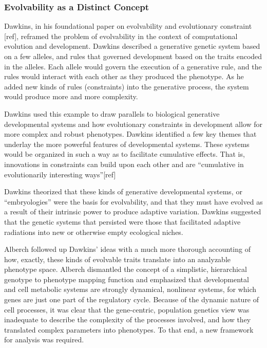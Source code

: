 \subsubsection{Evolvability as a Distinct Concept}

Dawkins, in his foundational paper on evolvability and evolutionary constraint [ref], reframed the problem of evolvability in the context of computational evolution and development.  Dawkins described a generative genetic system based on a few alleles, and rules that governed development based on the traits encoded in the alleles.  Each allele would govern the execution of a generative rule, and the rules would interact with each other as they produced the phenotype. As he added new kinds of rules (constraints) into the generative process, the system would produce more and more complexity.

Dawkins used this example to draw parallels to biological generative developmental systems and how evolutionary constraints in development allow for more complex and robust phenotypes. Dawkins identified a few key themes that underlay the more powerful features of developmental systems. These systems would be organized in such a way as to facilitate cumulative effects. That is, innovations in constraints can build upon each other and are “cumulative in evolutionarily interesting ways”[ref]

Dawkins theorized that these kinds of generative developmental systems, or “embryologies” were the basis for evolvability, and that they must have evolved as a result of their intrinsic power to produce adaptive variation. Dawkins suggested that the genetic systems that persisted were those that facilitated adaptive radiations into new or otherwise empty ecological niches.

Alberch followed up Dawkins’ ideas with a much more thorough accounting of how, exactly, these kinds of evolvable traits translate into an analyzable phenotype space. Alberch dismantled the concept of a simplistic, hierarchical genotype to phenotype mapping function and emphasized that developmental and cell metabolic systems are strongly dynamical, nonlinear systems, for which genes are just one part of the regulatory cycle. Because of the dynamic nature of cell processes, it was clear that the gene-centric, population genetics view was inadequate to describe the complexity of the processes involved, and how they translated complex parameters into phenotypes. To that end, a new framework for analysis was required.

